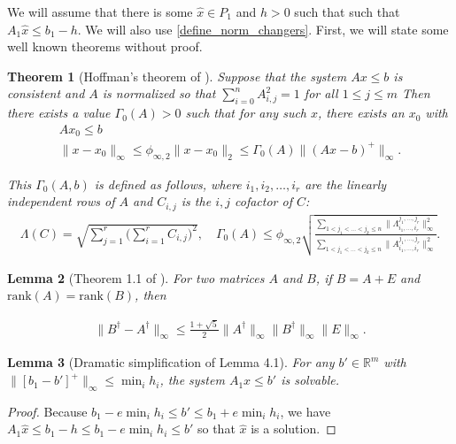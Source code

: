 \documentclass{article}
\newtheorem{theorem}{Theorem}[section]
\newtheorem{lemma}[theorem]{Lemma}
\theoremstyle{case}
\newcommand{\huff}{{\Gamma_0}}
\newcommand{\Rm}{\mathbb R^m}
\begin{document}
We will assume that there is some $\hat x \in P_1$ and $h > 0$ such that such that $A_1 \hat x \le b_1 - h$.
We will also use \cref{define_norm_changers}.
First, we will state some well known theorems without proof.
\begin{theorem}[Hoffman's theorem of \cite{dummy:hoffman}]
\label{hoffman}
Suppose that the system $Ax \le b$ is consistent and $A$ is normalized so that $\sum_{i = 0}^n{A}_{i,j}^2 = 1$ for all $1 \le j \le m$
Then there exists a value $\huff(A) > 0$ such that for any such $x$, there exists an $x_0$ with
\begin{align*}
Ax_0 \le b \\
\|x - x_0\|_{\infty} \le \phi_{\infty, 2}\|x - x_0\|_2 \le {\huff(A)} \|(Ax - b)^+\|_\infty.
\end{align*}

This $\huff(A,b)$ is defined as follows, where $i_1, i_2, \ldots, i_r$ are the linearly independent rows of $A$ and $C_{i,j}$ is the $i,j$ cofactor of $C$:
\begin{align*}
\Lambda(C) = \sqrt{\sum_{j=1}^r\bigg(\sum_{i=1}^r C_{i,j}\bigg)^2}, \quad
{\huff(A)} \le \phi_{\infty, 2}\sqrt{\frac{\sum_{1 < j_1 < \ldots < j_k \le n} \|\Lambda^{j_1,\ldots,j_r}_{i_1,\ldots, i_r}\|_{\infty}^2}{\sum_{1 < j_1 < \ldots < j_k \le n} \|A^{j_1,\ldots,j_r}_{i_1,\ldots, i_r}\|_{\infty}^2}}.
\end{align*}
\end{theorem}


\begin{lemma}[Theorem 1.1 of \cite{dummy:continuity_of_inverse}]
\label{inverse_is_continuous}
For two matrices $A$ and $B$, if $B = A + E$ and $\text{rank}(A) = \text{rank}(B)$, then

\begin{align*}
\|B^{\dagger} - A^{\dagger} \|_\infty \le \frac{1 + \sqrt{5}}{2} \|A^{\dagger}\|_\infty\|B^{\dagger}\|_\infty\|E\|_\infty.
\end{align*}
\end{lemma}



\begin{lemma}[Dramatic simplification of Lemma 4.1]
\label{4_1}
For any $b' \in \Rm$ with $\|\left[b_1 - b'\right]^+\|_{\infty} \le \min_i h_i$, the system $A_1x \le b'$ is solvable.
\end{lemma}

\begin{proof}
Because $b_1 - e \min_i h_i \le b' \le b_1 + e \min_i h_i$, we have $A_1\hat x\le b_1 - h\le b_1 - e \min_i h_i \le b'$ so that $\hat x$ is a solution.
\end{proof}
\end{document}
